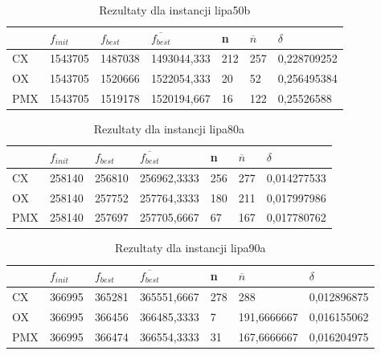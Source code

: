 \begin{table}[H]
\label{T2_lipa50b}
\begin{tabular}{l l l l l l l}
\hline
 & $f_{init}$ & $f_{best}$ & $\overline{f_{best}}$ & n & $\overline{n}$ & $\delta$ \\
\hline
CX & 1543705 & 1487038 & 1493044,333 & 212 & 257 & 0,228709252\\
OX & 1543705 & 1520666 & 1522054,333 & 20 & 52 & 0,256495384\\
PMX & 1543705 & 1519178 & 1520194,667 & 16 & 122 & 0,25526588\\
\hline
\end{tabular}
\caption{Rezultaty dla instancji lipa50b}
\end{table}

\begin{table}[H]
\label{T2_lipa80a}
\begin{tabular}{l l l l l l l}
\hline
 & $f_{init}$ & $f_{best}$ & $\overline{f_{best}}$ & n & $\overline{n}$ & $\delta$ \\
\hline
CX & 258140 & 256810 & 256962,3333 & 256 & 277 & 0,014277533\\
OX & 258140 & 257752 & 257764,3333 & 180 & 211 & 0,017997986\\
PMX & 258140 & 257697 & 257705,6667 & 67 & 167 & 0,017780762\\
\hline
\end{tabular}
\caption{Rezultaty dla instancji lipa80a}
\end{table}

\begin{table}[H]
\label{T2_lipa90a}
\begin{tabular}{l l l l l l l}
\hline
 & $f_{init}$ & $f_{best}$ & $\overline{f_{best}}$ & n & $\overline{n}$ & $\delta$ \\
\hline
CX & 366995 & 365281 & 365551,6667 & 278 & 288 & 0,012896875\\
OX & 366995 & 366456 & 366485,3333 & 7 & 191,6666667 & 0,016155062\\
PMX	& 366995 & 366474 & 366554,3333 & 31 & 167,6666667 & 0,016204975\\
\hline
\end{tabular}
\caption{Rezultaty dla instancji lipa90a}
\end{table}

